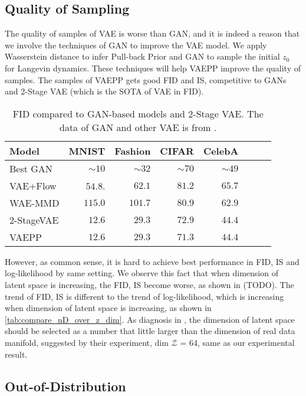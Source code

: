\subsection{Quality of Sampling}
The quality of samples of VAE is worse than GAN, and it is indeed a reason that we involve the techniques of GAN to improve the VAE model. We apply Wasserstein distance to infer Pull-back Prior and GAN to sample the initial $z_0$ for Langevin dynamics. These techniques will help VAEPP improve the quality of samples. The samples of VAEPP gets good FID and IS, competitive to GANs and 2-Stage VAE (which is the SOTA of VAE in FID). 
\begin{table}[tb]
\centering
\begin{tabular}{lrrrrrrr}  
\toprule
Model & MNIST & Fashion & CIFAR & CelebA\\
\midrule
Best GAN   & $\sim10$& $\sim32$&$\sim70$& $\sim49$\\
VAE+Flow   & $54.8$. & $62.1$  & $81.2$ & $65.7$\\
WAE-MMD    & $115.0$ & $101.7$ & $80.9$ & $62.9$\\
2-StageVAE & $12.6$  & $29.3$  & $72.9$ & $44.4$\\
VAEPP      & $12.6$  & $29.3$  & $71.3$ & $44.4$ \\
\bottomrule
\end{tabular}
\caption{FID compared to GAN-based models and 2-Stage VAE. The data of GAN and other VAE is from \protect\cite{dai2019diagnosing}. }
\label{tab:compare_FID}
\end{table}
However, as common sense, it is hard to achieve best performance in FID, IS and log-likelihood by same setting. We observe this fact that when dimension of latent space is increasing, the FID, IS become worse, as shown in (TODO). The trend of FID, IS is different to the trend of log-likelihood, which is increasing when dimension of latent space is increasing, as shown in \cref{tab:compare_nD_over_z_dim}. As diagnosis in \cite{dai2019diagnosing}, the dimension of latent space should be selected as a number that little larger than the dimension of real data manifold, suggested by their experiment, dim $\mathcal{Z}$ = 64, same as our experimental result.  

\subsection{Out-of-Distribution}

